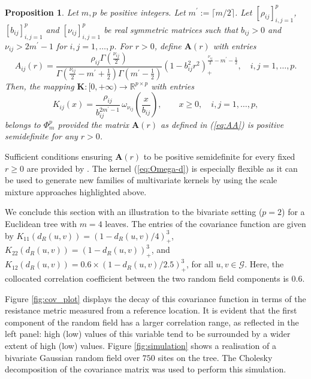 \documentclass[12pt]{article}
\theoremstyle{plain}
\newtheorem{proposition}{Proposition}
\theoremstyle{remark}
\newcommand{\R}[0]{\mathbb{R}}
\newcommand{\latMatr}[1]{\mathbf{#1}}          %
\begin{document}
\begin{proposition}
    \label{prop:infarto_miocardio} 
    Let $m,p$ be positive integers. Let $m^\prime:=\lceil m/2 \rceil$. Let $[\rho_{ij}]_{i,j=1}^p$, $[b_{ij}]_{i,j=1}^p$ and $[\nu_{ij}]_{i,j=1}^p$ be real symmetric matrices such that $b_{ij}>0$ and $\nu_{ij}>2{m^\prime}-1$ for $i,j=1,\ldots,p$. 
    For $r > 0$, define $\latMatr{A}(r)$ with entries
    \begin{equation}
        \label{eq:AA}
        A_{ij}(r) = \frac{\rho_{ij} \Gamma({\frac{\nu_{ij}}{2}})}{\Gamma({\frac{\nu_{ij}}{2}}-{m^\prime}+\frac{1}{2}) \Gamma({{m^\prime}-\frac{1}{2}})} \left ( 1- b_{ij}^2 r^2 \right )_+^{{\frac{\nu_{ij}}{2}}-{{m^\prime}-\frac{1}{2}}}, \quad i,j=1,\ldots,p.
    \end{equation}
    Then, the mapping $\latMatr{K}: [0,+\infty) \to \R^{p \times p} $ with entries 
    \begin{equation}
        \label{eq:Omega-d}
        K_{ij}(x) = \frac{\rho_{ij}}{b_{ij}^{{2{m^\prime}-1}}} \, \omega_{\nu_{ij}} \left ( \frac{x}{b_{ij}}\right ), \qquad x\ge 0, \quad i,j=1,\ldots, p,
    \end{equation}
    belongs to $\Phi_m^p$ provided the matrix $\latMatr{A}(r)$ as defined in (\ref{eq:AA}) is positive semidefinite for any $r > 0$. 
\end{proposition}
Sufficient conditions ensuring $\latMatr{A}(r)$ to be positive semidefinite for every fixed $r \ge 0$ are provided by \citet[Proposition 1]{emery2023schoenberg}. The kernel (\ref{eq:Omega-d}) is especially flexible as it can be used to generate new families of multivariate kernels by using the scale mixture approaches highlighted above. \par
We conclude this section with an illustration to the bivariate setting ($p=2$) for a Euclidean tree with $m=4$ leaves. The entries of the covariance function are given by $K_{11}(d_R(u,v)) = (1- d_R(u,v)/4)_+^3$, $K_{22}(d_R(u,v)) = (1- d_R(u,v))_+^3$, and $K_{12}(d_R(u,v)) = 0.6 \times (1- d_R(u,v)/2.5)_+^3$, for all $u,v\in\mathcal{G}$. Here, the collocated correlation coefficient between the two random field components is $0.6$. \par
Figure \ref{fig:cov_plot} displays the decay of this covariance function in terms of the resistance metric measured from a reference location. It is evident that the first component of the random field has a larger correlation range, as reflected in the left panel: high (low) values of this variable tend to be surrounded by a wider extent of high (low) values.
Figure \ref{fig:simulation} shows a realisation of a bivariate Gaussian random field over $750$ sites on the tree. The Cholesky decomposition of the covariance matrix was used to perform this simulation. \par
\end{document}
